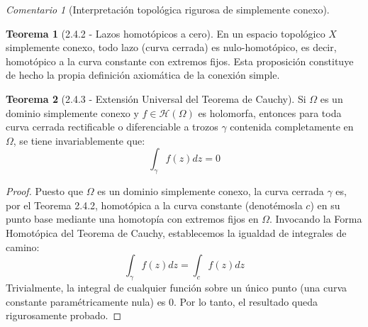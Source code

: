 \documentclass[11pt,a4paper]{article}
\theoremstyle{definition}
\newtheorem{teorema}{Teorema}[section]
\theoremstyle{remark}
\newtheorem{observacion}{Comentario}[section]
\numberwithin{equation}{section}
\begin{document}
\begin{observacion}[Interpretación topológica rigurosa de simplemente conexo]
\begin{center}
\end{center}
\end{observacion}

\begin{teorema}[2.4.2 - Lazos homotópicos a cero]
En un espacio topológico $X$ simplemente conexo, todo lazo (curva cerrada) es nulo-homotópico, es decir, homotópico a la curva constante con extremos fijos. Esta proposición constituye de hecho la propia definición axiomática de la conexión simple.
\end{teorema}

\begin{teorema}[2.4.3 - Extensión Universal del Teorema de Cauchy]
Si $\Omega$ es un dominio simplemente conexo y $f \in \mathcal{H}(\Omega)$ es holomorfa, entonces para toda curva cerrada rectificable o diferenciable a trozos $\gamma$ contenida completamente en $\Omega$, se tiene invariablemente que:
$$ \int_{\gamma} f(z) dz = 0 $$
\end{teorema}
\begin{proof}
Puesto que $\Omega$ es un dominio simplemente conexo, la curva cerrada $\gamma$ es, por el Teorema 2.4.2, homotópica a la curva constante (denotémosla $c$) en su punto base mediante una homotopía con extremos fijos en $\Omega$. 
Invocando la Forma Homotópica del Teorema de Cauchy, establecemos la igualdad de integrales de camino:
$$ \int_{\gamma} f(z) dz = \int_{c} f(z) dz $$
Trivialmente, la integral de cualquier función sobre un único punto (una curva constante paramétricamente nula) es $0$. Por lo tanto, el resultado queda rigurosamente probado.
\end{proof}
\end{document}
